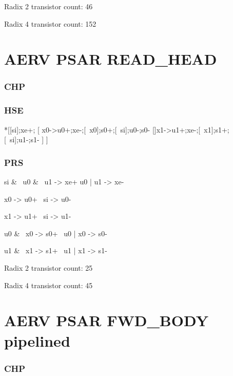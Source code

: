 \documentclass{article}
\begin{document}
Radix 2 transistor count: 46

Radix 4 transistor count: 152

\section{AERV PSAR READ\_HEAD}

\subsubsection*{CHP}

\subsubsection*{HSE}

\begin{hse}
*[[si];xe+;
    [ x0->u0+;xe-;[~x0];s0+;[~si];u0-;s0-
    []x1->u1+;xe-;[~x1];s1+;[~si];u1-;s1-
    ]
 ]
\end{hse}

\subsubsection*{PRS}

\begin{prs2}
si & ~u0 & ~u1 -> xe+
u0 | u1 -> xe-
\end{prs2}

\begin{prs2}
x0 -> u0+
~si -> u0-

x1 -> u1+
~si -> u1-

u0 & ~x0 -> s0+
~u0 | x0 -> s0-

u1 & ~x1 -> s1+
~u1 | x1 -> s1-
\end{prs2}

Radix 2 transistor count: 25

Radix 4 transistor count: 45

\section{AERV PSAR FWD\_BODY pipelined}

\subsubsection*{CHP}
\end{document}
